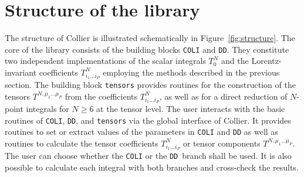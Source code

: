 \documentclass[preprint,sort&compress,12pt]{elsarticle}
\def\reffi#1{\mbox{Figure~\ref{#1}}}
\newcommand{\collier}{{\sc Collier}}
\newcommand{\coli}{{\tt COLI}}
\newcommand{\DD}{{\tt DD}}
\newcommand{\tensors}{{\tt tensors}}
\begin{document}
\section{Structure of the library}
\label{se:structure}

The structure of {\collier} is illustrated schematically
in \reffi{fig:structure}. The core of the library consists of the
building blocks {\coli} and {\DD}. They constitute two independent
implementations of the scalar integrals $T^N_0$ and the
Lorentz-invariant coefficients $T^N_{i_1\ldots i_P}$ employing the
methods described in the previous section. The building block {\tensors}
provides routines for the construction of the tensors
$T^{N,\mu_1\ldots \mu_P}$ from the coefficients $T^N_{i_1\ldots i_P}$,
as well as for a direct reduction of $N$-point integrals 
for $N\ge 6$ at the tensor
level. The user interacts with the basic routines of {\coli}, {\DD},
and {\tt tensors} via the global interface of {\collier}. It provides
routines to set or extract values of the parameters in
{\coli} and {\DD} as well as routines to calculate the
tensor coefficients $T^N_{i_1\ldots i_P}$ or tensor components
$T^{N,\mu_1\ldots \mu_P}$. The user can choose whether the {\coli} or the
{\DD}~branch shall be used. It is
also possible to calculate each integral with both branches 
and cross-check the results.
\end{document}
